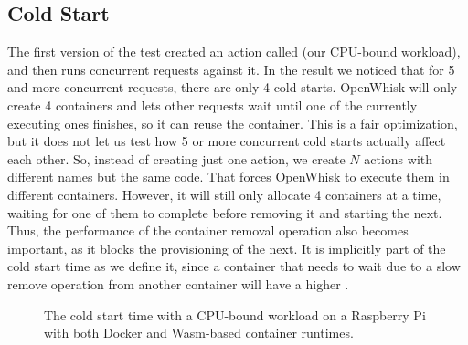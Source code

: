 \subsection{Cold Start}

The first version of the test created an action called  (our CPU-bound workload), and then runs concurrent requests against it. In the result we noticed that for 5 and more concurrent requests, there are only 4 cold starts. OpenWhisk will only create 4 containers and lets other requests wait until one of the currently executing ones finishes, so it can reuse the container. This is a fair optimization, but it does not let us test how 5 or more concurrent cold starts actually affect each other. So, instead of creating just one action, we create $N$ actions with different names but the same code. That forces OpenWhisk to execute them in different containers. However, it will still only allocate 4 containers at a time, waiting for one of them to complete before removing it and starting the next. Thus, the performance of the container removal operation also becomes important, as it blocks the provisioning of the next. It is implicitly part of the cold start time as we define it, since a container that needs to wait due to a slow remove operation from another container will have a higher .

\begin{figure}
    \begin{center}
        
    \end{center}
    \caption{The cold start time with a CPU-bound workload on a Raspberry Pi with both Docker and Wasm-based container runtimes.}
    \label{fig:pi-cold-start-hash}
\end{figure}

